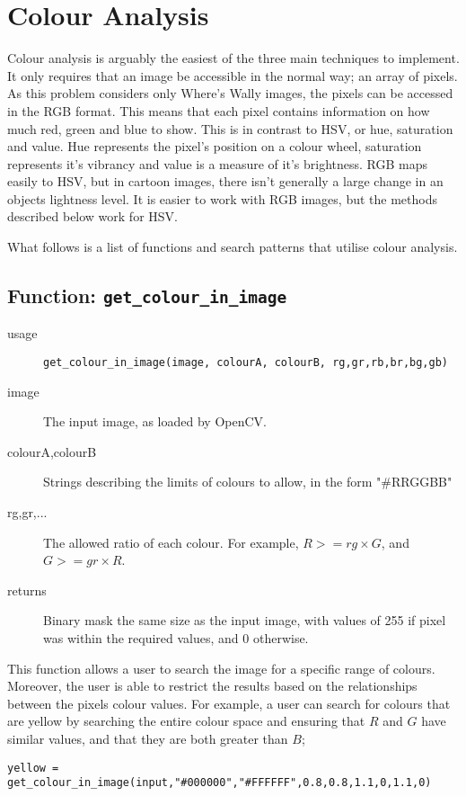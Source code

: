 \documentclass[../main.tex]{subfiles}
\begin{document}
  \section{Colour Analysis}
    Colour analysis is arguably the easiest of the three main techniques to implement.
    It only requires that an image be accessible in the normal way; an array of pixels.
    As this problem considers only Where's Wally images, the pixels can be accessed in the RGB format.
    This means that each pixel contains information on how much red, green and blue to show.
    This is in contrast to HSV, or hue, saturation and value.
    Hue represents the pixel's position on a colour wheel, saturation represents it's vibrancy and value is a measure of it's brightness.
    RGB maps easily to HSV, but in cartoon images, there isn't generally a large change in an objects lightness level.
    It is easier to work with RGB images, but the methods described below work for HSV.

    What follows is a list of functions and search patterns that utilise colour analysis.

  \subsection{Function: \texttt{get\_colour\_in\_image}}
    \label{function_getcolinimg}
    \begin{description}
      \item[usage] \texttt{get\_colour\_in\_image(image, colourA, colourB, rg,gr,rb,br,bg,gb)}
      \item[image] The input image, as loaded by OpenCV.
      \item[colourA,colourB] Strings describing the limits of colours to allow, in the form "\#RRGGBB"
      \item[rg,gr,...] The allowed ratio of each colour. For example, $R >= rg\times G$, and $G >=gr\times R$.
      \item[returns] Binary mask the same size as the input image, with values of 255 if pixel was within the required values, and 0 otherwise.
    \end{description}

    This function allows a user to search the image for a specific range of colours.
    Moreover, the user is able to restrict the results based on the relationships between the pixels colour values.
    For example, a user can search for colours that are yellow by searching the entire colour space and ensuring that $R$ and $G$ have similar values, and that they are both greater than $B$;
    \begin{center}
      \texttt{yellow = get\_colour\_in\_image(input,"\#000000","\#FFFFFF",0.8,0.8,1.1,0,1.1,0)}
    \end{center}
\end{document}
